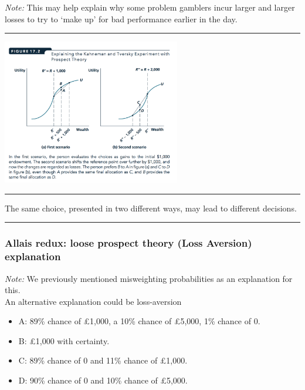 \documentclass[]{article}
\providecommand{\tightlist}{%
  \setlength{\itemsep}{0pt}\setlength{\parskip}{0pt}}
\begin{document}
\emph{Note:} This may help explain why some problem gamblers incur larger and larger losses to try to `make up' for bad performance earlier in the day.

\begin{center}\rule{0.5\linewidth}{\linethickness}\end{center}

\includegraphics[height=2.5in]{picsfigs/ktprospect.png}

\begin{center}\rule{0.5\linewidth}{\linethickness}\end{center}

\begin{description}
\tightlist
\item[Framing effect]
The same choice, presented in two different ways, may lead to different decisions.
\end{description}

\begin{center}\rule{0.5\linewidth}{\linethickness}\end{center}

\hypertarget{allais-redux-loose-prospect-theory-loss-aversion-explanation}{%
\subsubsection{Allais redux: loose prospect theory (Loss Aversion) explanation}\label{allais-redux-loose-prospect-theory-loss-aversion-explanation}}

\emph{Note:} We previously mentioned misweighting probabilities as an explanation for this.\\
An alternative explanation could be loss-aversion

\begin{itemize}
\tightlist
\item
  A: 89\% chance of \pounds1,000, a 10\% chance of \pounds5,000, 1\% chance of 0.
\item
  B: \pounds1,000 with certainty.
\item
  C: 89\% chance of 0 and 11\% chance of \pounds1,000.
\item
  D: 90\% chance of 0 and 10\% chance of \pounds5,000.
\end{itemize}
\end{document}
